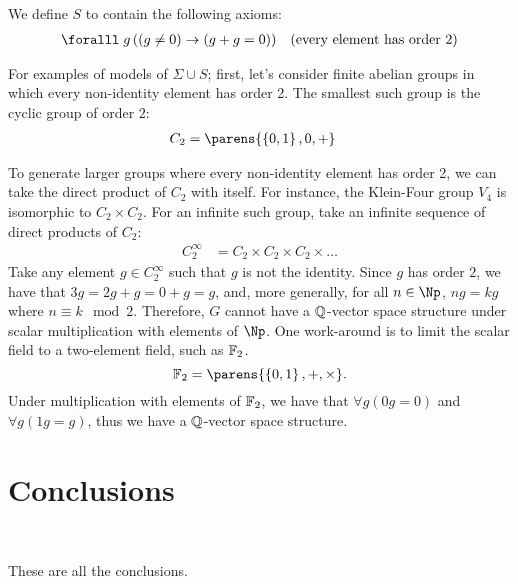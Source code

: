 We define $S$ to contain the following axioms:
\begin{align}
  \forall g\, ( (g \neq 0) \lto (g + g &= 0) ) &\text{(every element has order 2)}
\end{align}

\bigskip
For examples of models of $\Sigma \cup S$;
first, let's consider finite abelian groups in which every non-identity
element has order 2.
The smallest such group is the cyclic group of order $2$:
\begin{align*}
  C_2 &= \parens{ \set{0, 1}, 0, + }
\end{align*}

To generate larger groups where every non-identity element has order 2,
we can take the direct product of $C_2$ with itself.
For instance, the Klein-Four group $V_4$ is isomorphic to $C_2 \times C_2$.
For an infinite such group, take an infinite sequence of direct products of $C_2$:
\begin{align*}
  C_2^{\infty} &= C_2 \times C_2 \times C_2 \times \ldots
\end{align*}
Take any element $g \in C_2^{\infty}$ such that $g$ is not the identity.
Since $g$ has order $2$, we have that $3g = 2g + g = 0 + g = g$,
and, more generally, for all $n \in \Np$, $ng = k g$ where $n \equiv k \mod 2$.
Therefore, $G$ cannot have a $\mathbb{Q}$-vector space structure under scalar multiplication
with elements of $\Np$.
One work-around is to limit the scalar field to a two-element field,
such as $\mathbb{F}_2$.
\[ \F_2 = \parens{\set{0, 1}, +, \times}. \]
Under multiplication with elements of $\mathbb{F}_2$, we have that
$\forall g (0g = 0)$ and $\forall g (1g = g)$, thus we have a
$\mathbb{Q}$-vector space structure.

\section{Conclusions}~\label{sec:conclusions}

These are all the conclusions.


